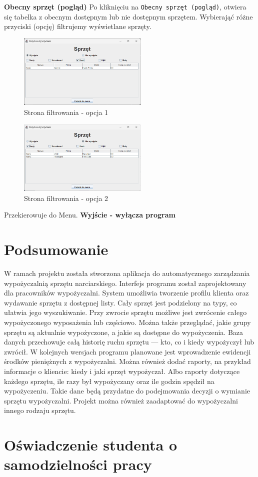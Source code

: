     \newpage
    \textbf{Obecny sprzęt (pogląd)}
        \newline
        Po kliknięciu na \texttt{Obecny sprzęt (pogląd)}, otwiera się tabelka z obecnym dostępnym lub nie dostępnym sprzętem. Wybierająć różne przyciski (opcję) filtrujemy wyświetlane sprzęty.
        \begin{figure}[h]
            \centering
            \includegraphics[width=0.55\textwidth]{figures/opcja1.jpg}
            \caption{Strona filtrowania - opcja 1}
        \end{figure}
        \begin{figure}[h]
            \centering
            \includegraphics[width=0.55\textwidth]{figures/opcja2.jpg}
            \caption{Strona filtrowania - opcja 2}
        \end{figure}
        \newline Przekierowuje do Menu.
    \textbf{Wyjście - wyłącza program}


\clearpage
\section{Podsumowanie}

W ramach projektu została stworzona aplikacja do automatycznego zarządzania wypożyczalnią sprzętu narciarskiego. Interfejs programu został zaprojektowany dla pracowników wypożyczalni. System umożliwia tworzenie profilu klienta oraz wydawanie sprzętu z dostępnej listy. Cały sprzęt jest podzielony na typy, co ułatwia jego wyszukiwanie. Przy zwrocie sprzętu możliwe jest zwrócenie całego wypożyczonego wyposażenia lub częściowo. Można także przeglądać, jakie grupy sprzętu są aktualnie wypożyczone, a jakie są dostępne do wypożyczenia. Baza danych przechowuje całą historię ruchu sprzętu — kto, co i kiedy wypożyczył lub zwrócił.
W kolejnych wersjach programu planowane jest wprowadzenie ewidencji środków pieniężnych z wypożyczalni. Można również dodać raporty, na przykład informacje o kliencie: kiedy i jaki sprzęt wypożyczał. Albo raporty dotyczące każdego sprzętu, ile razy był wypożyczany oraz ile godzin spędził na wypożyczeniu. Takie dane będą przydatne do podejmowania decyzji o wymianie sprzętu wypożyczalni. Projekt można również zaadaptować do wypożyczalni innego rodzaju sprzętu.

\section{Oświadczenie studenta o samodzielności pracy}


